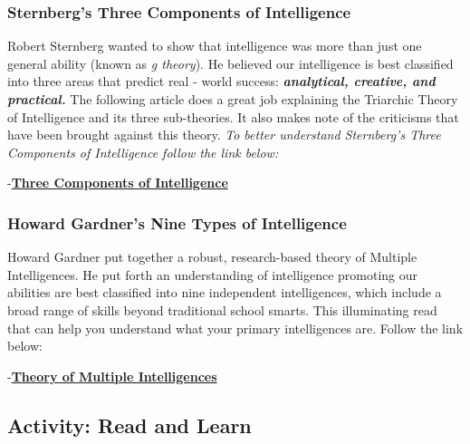 \documentclass[
]{book}
\begin{document}
\hypertarget{sternbergs-three-components-of-intelligence}{%
\subsubsection*{Sternberg's Three Components of Intelligence}\label{sternbergs-three-components-of-intelligence}}

Robert Sternberg wanted to show that intelligence was more than just one general ability (known as \emph{g theory}). He believed our intelligence is best classified into three areas that predict real - world success: \textbf{\emph{analytical, creative, and practical.}} The following article does a great job explaining the Triarchic Theory of Intelligence and its three sub-theories. It also makes note of the criticisms that have been brought against this theory. \emph{To better understand Sternberg's Three Components of Intelligence follow the link below:}

-\href{https://www.thoughtco.com/triarchic-theory-of-intelligence-4172497}{\textbf{Three Components of Intelligence}}

\hypertarget{howard-gardners-nine-types-of-intelligence}{%
\subsubsection*{Howard Gardner's Nine Types of Intelligence}\label{howard-gardners-nine-types-of-intelligence}}

Howard Gardner put together a robust, research-based theory of Multiple Intelligences. He put forth an understanding of intelligence promoting our abilities are best classified into nine independent intelligences, which include a broad range of skills beyond traditional school smarts. This illuminating read that can help you understand what your primary intelligences are. Follow the link below:

-\href{https://www.niu.edu/citl/resources/guides/instructional-guide/gardners-theory-of-multiple-intelligences.shtml}{\textbf{Theory of Multiple Intelligences}}

\hypertarget{activity-read-and-learn}{%
\subsection*{Activity: Read and Learn}\label{activity-read-and-learn}}
\end{document}
